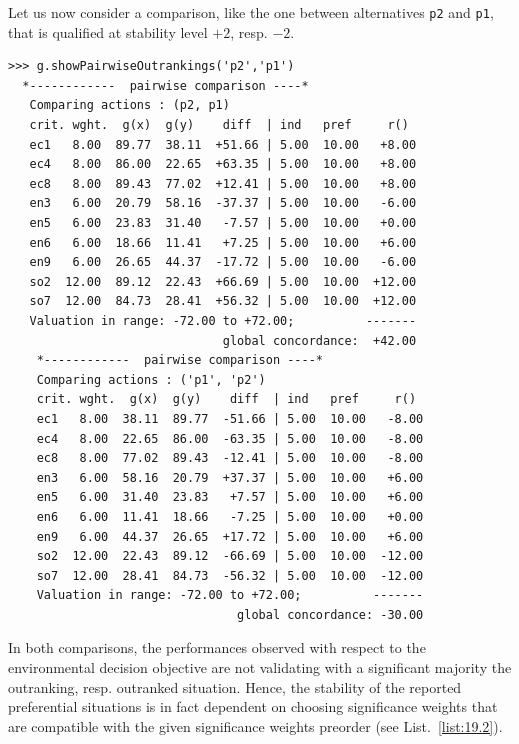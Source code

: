 Let us now consider a comparison, like the one between alternatives \texttt{p2} and \texttt{p1}, that is qualified at stability level $+2$, resp. $-2$.
\begin{lstlisting}[caption={Comparison of alternatives \texttt{p2} and \texttt{p1}},label=list:19.5]
>>> g.showPairwiseOutrankings('p2','p1')
  *------------  pairwise comparison ----*
   Comparing actions : (p2, p1)
   crit. wght.  g(x)  g(y)    diff  | ind   pref     r()
   ec1   8.00  89.77  38.11  +51.66 | 5.00  10.00   +8.00
   ec4   8.00  86.00  22.65  +63.35 | 5.00  10.00   +8.00
   ec8   8.00  89.43  77.02  +12.41 | 5.00  10.00   +8.00
   en3   6.00  20.79  58.16  -37.37 | 5.00  10.00   -6.00
   en5   6.00  23.83  31.40   -7.57 | 5.00  10.00   +0.00
   en6   6.00  18.66  11.41   +7.25 | 5.00  10.00   +6.00
   en9   6.00  26.65  44.37  -17.72 | 5.00  10.00   -6.00
   so2  12.00  89.12  22.43  +66.69 | 5.00  10.00  +12.00
   so7  12.00  84.73  28.41  +56.32 | 5.00  10.00  +12.00
   Valuation in range: -72.00 to +72.00;          -------
                              global concordance:  +42.00
    *------------  pairwise comparison ----*
    Comparing actions : ('p1', 'p2')
    crit. wght.  g(x)  g(y)    diff  | ind   pref     r()
    ec1   8.00  38.11  89.77  -51.66 | 5.00  10.00   -8.00
    ec4   8.00  22.65  86.00  -63.35 | 5.00  10.00   -8.00
    ec8   8.00  77.02  89.43  -12.41 | 5.00  10.00   -8.00
    en3   6.00  58.16  20.79  +37.37 | 5.00  10.00   +6.00
    en5   6.00  31.40  23.83   +7.57 | 5.00  10.00   +6.00 
    en6   6.00  11.41  18.66   -7.25 | 5.00  10.00   +0.00
    en9   6.00  44.37  26.65  +17.72 | 5.00  10.00   +6.00
    so2  12.00  22.43  89.12  -66.69 | 5.00  10.00  -12.00
    so7  12.00  28.41  84.73  -56.32 | 5.00  10.00  -12.00
    Valuation in range: -72.00 to +72.00;          -------
                                global concordance: -30.00
\end{lstlisting}
In both comparisons, the performances observed with respect to the environmental decision objective are not validating with a significant majority the outranking, resp. outranked situation. Hence, the stability of the reported preferential situations is in fact dependent on choosing significance weights that are compatible with the given significance weights preorder (see List.~\vref{list:19.2}).

